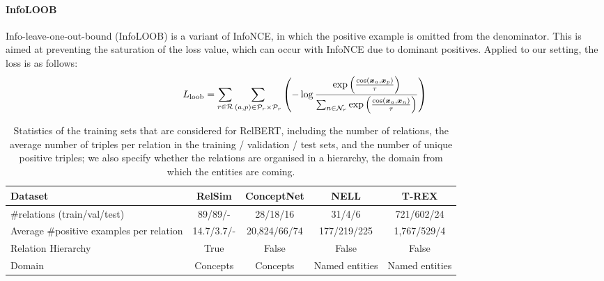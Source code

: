 \documentclass[3p]{elsarticle}
\begin{document}
{\paragraph{InfoLOOB}
Info-leave-one-out-bound (InfoLOOB) \cite{furst2021cloob} is a variant of InfoNCE, in which the positive example is omitted from the denominator. This is aimed at preventing the saturation of the loss value, which can occur with InfoNCE due to dominant positives. Applied to our setting, the loss is as follows:
\begin{align}
    L_{{\rm loob}} =  \sum_{r\in\mathcal{R}} \sum_{(a, p)\in \mathcal{P}_r \times \mathcal{P}_r}  \left(
    - \log \frac{
         \exp{\left( \frac{{\rm cos}(\bm{x}_a, \bm{x}_p)}{\tau} \right)}
        }{\sum_{n \in \mathcal{N}_r} \exp{\left(\frac{{\rm cos}(\bm{x}_a, \bm{x}_n)}{\tau} \right)} 
        }
    \right)
\end{align}


\begin{table}[t]
\centering
\begin{tabular}{lcccc}
\toprule
Dataset                                 & RelSim    & ConceptNet    & NELL              & T-REX \\
\midrule
\#relations (train/val/test)                            & 89/89/-   & 28/18/16      & 31/4/6            & 721/602/24  \\
Average \#positive examples per relation& 14.7/3.7/-& 20,824/66/74  & 177/219/225       & 1,767/529/4\\
Relation Hierarchy                      & True      & False         & False             & False \\
Domain                                  & Concepts  & Concepts      & Named entities    & Named entities \\
\bottomrule
\end{tabular}
\caption{Statistics of the training sets that are considered for RelBERT, including the number of relations, the average number of triples per relation in the training / validation / test sets, and the number of unique positive triples; we also specify whether the relations are organised in a hierarchy, the domain from which the entities are coming.}
\label{tab:relbert:relbert-data-stats}
\end{table}

}
\end{document}
